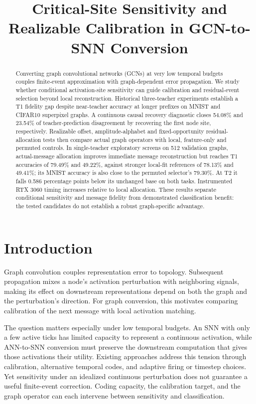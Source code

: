 \documentclass[11pt]{article}
\title{Critical-Site Sensitivity and Realizable Calibration in GCN-to-SNN Conversion}
\author{}
\date{}
\begin{document}
\maketitle

\begin{abstract}

Converting graph convolutional networks (GCNs) at very low temporal budgets couples finite-event approximation with graph-dependent error propagation. We study whether conditional activation-site sensitivity can guide calibration and residual-event selection beyond local reconstruction. Historical three-teacher experiments establish a T1 fidelity gap despite near-teacher accuracy at longer prefixes on MNIST and CIFAR10 superpixel graphs. A continuous causal recovery diagnostic closes 54.08\% and 23.54\% of teacher-prediction disagreement by recovering the first node site, respectively. Realizable offset, amplitude-alphabet and fixed-opportunity residual-allocation tests then compare actual graph operators with local, feature-only and permuted controls. In single-teacher exploratory screens on 512 validation graphs, actual-message allocation improves immediate message reconstruction but reaches T1 accuracies of 79.49\% and 49.22\%, against stronger local-fit references of 78.13\% and 49.41\%; its MNIST accuracy is also close to the permuted selector's 79.30\%. At T2 it falls 0.586 percentage points below its unchanged base on both tasks. Instrumented RTX 3060 timing increases relative to local allocation. These results separate conditional sensitivity and message fidelity from demonstrated classification benefit: the tested candidates do not establish a robust graph-specific advantage.

\end{abstract}

\section{Introduction}

Graph convolution couples representation error to topology. Subsequent propagation mixes a node's activation perturbation with neighboring signals, making its effect on downstream representations depend on both the graph and the perturbation's direction. For graph conversion, this motivates comparing calibration of the next message with local activation matching.

The question matters especially under low temporal budgets. An SNN with only a few active ticks has limited capacity to represent a continuous activation, while ANN-to-SNN conversion must preserve the downstream computation that gives those activations their utility. Existing approaches address this tension through calibration, alternative temporal codes, and adaptive firing or timestep choices. Yet sensitivity under an idealized continuous perturbation does not guarantee a useful finite-event correction. Coding capacity, the calibration target, and the graph operator can each intervene between sensitivity and classification.
\end{document}
